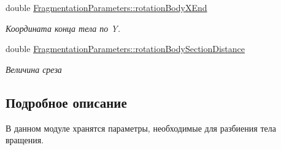 \begin{DoxyCompactItemize}
double \mbox{\hyperlink{group__rotation_body_parameters_ga8507989eaebe1d60032a373a3412e75a}{Fragmentation\+Parameters\+::rotation\+Body\+X\+End}}
\begin{DoxyCompactList}\small\item\em Координата конца тела по Y. \end{DoxyCompactList}\item 
\mbox{\label{group__rotation_body_parameters_ga121bce6fb5cf863b3bd1e9249ee2b493}} 
double \mbox{\hyperlink{group__rotation_body_parameters_ga121bce6fb5cf863b3bd1e9249ee2b493}{Fragmentation\+Parameters\+::rotation\+Body\+Section\+Distance}}
\begin{DoxyCompactList}\small\item\em Величина среза \end{DoxyCompactList}\end{DoxyCompactItemize}


\subsection{Подробное описание}
В данном модуле хранятся параметры, необходимые для разбиения тела вращения. 

